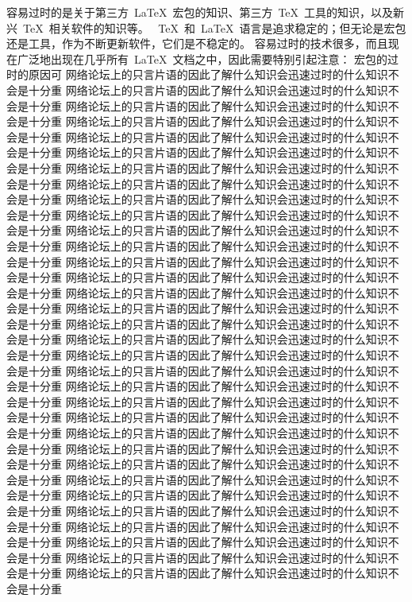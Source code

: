 容易过时的是关于第三方~\LaTeX~宏包的知识、第三方~\TeX~工具的知识，以及新兴~\TeX~相关软件的知识等。
~\TeX~和~\LaTeX~语言是追求稳定的；但无论是宏包还是工具，作为不断更新软件，它们是不稳定的。
容易过时的技术很多，而且现在广泛地出现在几乎所有~\LaTeX~文档之中，因此需要特别引起注意：
宏包的过时的原因可
网络论坛上的只言片语的因此了解什么知识会迅速过时的什么知识不会是十分重\cite{hollnagel1993human}
网络论坛上的只言片语的因此了解什么知识会迅速过时的什么知识不会是十分重
网络论坛上的只言片语的因此了解什么知识会迅速过时的什么知识不会是十分重
网络论坛上的只言片语的因此了解什么知识会迅速过时的什么知识不会是十分重
网络论坛上的只言片语的因此了解什么知识会迅速过时的什么知识不会是十分重
网络论坛上的只言片语的因此了解什么知识会迅速过时的什么知识不会是十分重
网络论坛上的只言片语的因此了解什么知识会迅速过时的什么知识不会是十分重
网络论坛上的只言片语的因此了解什么知识会迅速过时的什么知识不会是十分重
网络论坛上的只言片语的因此了解什么知识会迅速过时的什么知识不会是十分重
网络论坛上的只言片语的因此了解什么知识会迅速过时的什么知识不会是十分重
网络论坛上的只言片语的因此了解什么知识会迅速过时的什么知识不会是十分重
网络论坛上的只言片语的因此了解什么知识会迅速过时的什么知识不会是十分重
网络论坛上的只言片语的因此了解什么知识会迅速过时的什么知识不会是十分重
网络论坛上的只言片语的因此了解什么知识会迅速过时的什么知识不会是十分重
网络论坛上的只言片语的因此了解什么知识会迅速过时的什么知识不会是十分重
网络论坛上的只言片语的因此了解什么知识会迅速过时的什么知识不会是十分重
网络论坛上的只言片语的因此了解什么知识会迅速过时的什么知识不会是十分重
网络论坛上的只言片语的因此了解什么知识会迅速过时的什么知识不会是十分重
网络论坛上的只言片语的因此了解什么知识会迅速过时的什么知识不会是十分重
网络论坛上的只言片语的因此了解什么知识会迅速过时的什么知识不会是十分重
网络论坛上的只言片语的因此了解什么知识会迅速过时的什么知识不会是十分重
网络论坛上的只言片语的因此了解什么知识会迅速过时的什么知识不会是十分重
网络论坛上的只言片语的因此了解什么知识会迅速过时的什么知识不会是十分重
网络论坛上的只言片语的因此了解什么知识会迅速过时的什么知识不会是十分重
网络论坛上的只言片语的因此了解什么知识会迅速过时的什么知识不会是十分重
网络论坛上的只言片语的因此了解什么知识会迅速过时的什么知识不会是十分重
网络论坛上的只言片语的因此了解什么知识会迅速过时的什么知识不会是十分重
网络论坛上的只言片语的因此了解什么知识会迅速过时的什么知识不会是十分重
网络论坛上的只言片语的因此了解什么知识会迅速过时的什么知识不会是十分重
网络论坛上的只言片语的因此了解什么知识会迅速过时的什么知识不会是十分重
网络论坛上的只言片语的因此了解什么知识会迅速过时的什么知识不会是十分重
网络论坛上的只言片语的因此了解什么知识会迅速过时的什么知识不会是十分重
网络论坛上的只言片语的因此了解什么知识会迅速过时的什么知识不会是十分重
